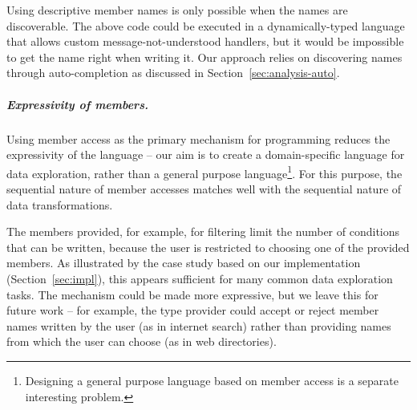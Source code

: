 \documentclass[a4paper,UKenglish]{lipics-v2016}
\theoremstyle{plain}
\theoremstyle{definition}
\begin{document}
Using descriptive member names is only possible when the names are discoverable. The above
code could be executed in a dynamically-typed language that allows custom message-not-understood
handlers, but it would be impossible to get the name right when writing it. Our approach 
relies on discovering names through auto-completion as discussed in Section~\ref{sec:analysis-auto}.

\subparagraph{Expressivity of members.} 
Using member access as the primary mechanism for programming reduces the expressivity of the 
language -- our aim is to create a domain-specific language for data exploration, rather than
a general purpose language\footnote{Designing a general purpose language based on member access
is a separate interesting problem.}. For this purpose, the sequential nature of member accesses 
matches well with the sequential nature of data transformations.

The members provided, for example, for filtering limit the number of conditions that can be 
written, because the user is restricted to choosing one of the provided members.
As illustrated by the case study based on our implementation (Section~\ref{sec:impl}),
this appears sufficient for many common data exploration tasks. The mechanism could be made
more expressive, but we leave this for future work -- for example, the type provider could
accept or reject member names written by the user (as in internet search) rather than providing 
names from which the user can choose (as in web directories).

 
\end{document}
